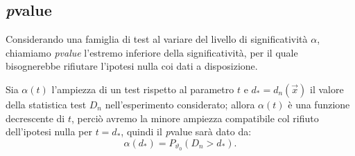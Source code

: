         \subsection{\emph{p}\nbdash value}
            \begin{defn}
                Considerando una famiglia di test al variare del livello di significatività $\alpha$, 
                chiamiamo \emph{p\nbdash value} l'estremo inferiore della significatività, per il quale 
                bisognerebbe rifiutare l'ipotesi nulla coi dati a disposizione.
            \end{defn}
            \begin{obsv}
                Sia $\alpha(t)$ l'ampiezza di un test rispetto al parametro $t$ e $d_* = d_n(\vec{x})$ il 
                valore della statistica test $D_n$ nell'esperimento considerato; allora $\alpha(t)$ è 
                una funzione decrescente di $t$, perciò avremo la minore ampiezza compatibile col rifiuto 
                dell'ipotesi nulla per $t = d_*$, quindi il \emph{p}\nbdash value sarà dato da: \[
                    \alpha(d_*) = P_{\vartheta_0}(D_n > d_*)
                .\] 
            \end{obsv}
